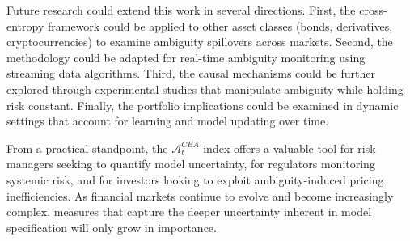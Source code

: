 \documentclass[preprint,12pt,authoryear]{elsarticle}
\begin{document}
Future research could extend this work in several directions. First, the cross-entropy framework could be applied to other asset classes (bonds, derivatives, cryptocurrencies) to examine ambiguity spillovers across markets. Second, the methodology could be adapted for real-time ambiguity monitoring using streaming data algorithms. Third, the causal mechanisms could be further explored through experimental studies that manipulate ambiguity while holding risk constant. Finally, the portfolio implications could be examined in dynamic settings that account for learning and model updating over time.

From a practical standpoint, the $\mathcal{A}^{CEA}_t$ index offers a valuable tool for risk managers seeking to quantify model uncertainty, for regulators monitoring systemic risk, and for investors looking to exploit ambiguity-induced pricing inefficiencies. As financial markets continue to evolve and become increasingly complex, measures that capture the deeper uncertainty inherent in model specification will only grow in importance.



\end{document}

